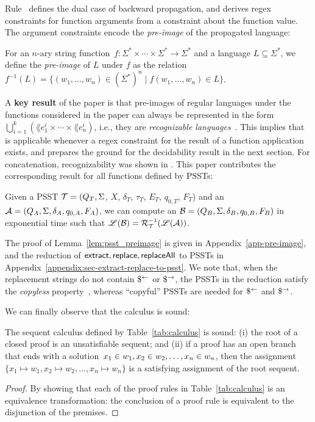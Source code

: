 Rule~ defines the dual case of backward
propagation, and derives regex constraints for function arguments
from a constraint about the function value. The argument constraints
encode the \emph{pre-image} of the propagated language:
%
\begin{definition}
  For an $n$-ary string
  function~$f : \Sigma^* \times \cdots \times \Sigma^* \to \Sigma^*$
  and a language $L \subseteq \Sigma^*$, we define the
  \emph{pre-image} of $L$ under $f$ as the relation
  $f^{-1}(L) = \{(w_1, \ldots, w_n) \in (\Sigma^*)^n \mid 
  f(w_1, \ldots, w_n) \in L\}$.
\end{definition}
A \textbf{key result} of the paper is that pre-images of regular
languages under the functions considered in the paper can always be
represented in the
form~$\bigcup_{i=1}^k ( \lang{e_1^i} \times \cdots \times \lang{e_n^i}
)$, i.e., they are \emph{recognizable languages}~\cite{X}. This implies that
 is applicable whenever a regex constraint for the
result of a function application exists, and prepares the ground for
the decidability result in the next section.  For concatenation,
recognizability was shown in \cite{Abdulla14,CHL+19}. This paper
contributes the corresponding result for all functions defined by
PSSTs:
%
\begin{lemma}
  \label{lem:psst_preimage}
  Given a PSST $\mathcal{T} = (Q_T, \Sigma$, $X$, $\delta_T$, $\tau_T$, $E_T$,  $q_{0, T}$, $F_T$) and an \FA{} $\mathcal{A}
  = (Q_A, \Sigma, \delta_A, q_{0, A}, F_A)$, we can compute an \FA{} $\mathcal{B} = (Q_B,
  \Sigma, \delta_B, q_{0, B}, F_B)$ in exponential time  such that $\mathscr{L}(\mathcal{B}) = \mathcal{R}^{-1}_{\mathcal{T}}(\mathscr{L}(\mathcal{A}))$.
\end{lemma}
The proof of Lemma~\ref{lem:psst_preimage} is given in
Appendix~\ref{app-pre-image}, and the reduction of
$\mathsf{extract}, \mathsf{replace}, \mathsf{replaceAll}$ to PSSTs in
Appendix~\ref{appendix:sec-extract-replace-to-psst}. 
We note that, when the replacement strings do not contain $\$^{\leftarrow}$ or $\$^{\rightarrow}$, the PSSTs in the reduction satisfy the \emph{copyless} property~\cite{AC10}, whereas ``copyful'' PSSTs are needed for $\$^{\leftarrow}$ and $\$^{\rightarrow}$.

\medskip
%
We can finally observe that the calculus is sound:
\begin{lemma}[Soundness]
  The sequent calculus defined by Table~\ref{tab:calculus} is sound:
  (i) the root of a closed proof is an unsatisfiable sequent; and (ii)
  if a proof has an open branch that ends with a
  solution~$x_1 \in w_1, x_2 \in w_2, \ldots, x_n \in w_n$, then
  the
  assignment~$\{x_1 \mapsto w_1, x_2 \mapsto w_2, \ldots, x_n \mapsto
  w_n\}$ is a satisfying assignment of the root sequent.
\end{lemma}

\begin{proof}
  By showing that each of the proof rules in Table~\ref{tab:calculus}
  is an equivalence transformation: the conclusion of a proof rule is
  equivalent to the disjunction of the premises.
\end{proof}

